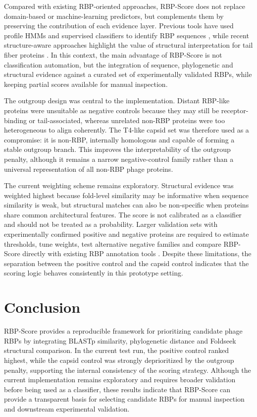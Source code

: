 \documentclass[runningheads]{llncs}
\begin{document}
Compared with existing RBP-oriented approaches, RBP-Score does not replace domain-based or machine-learning predictors, but complements them by preserving the contribution of each evidence layer. Previous tools have used profile HMMs and supervised classifiers to identify RBP sequences \cite{boeckaerts2022}, while recent structure-aware approaches highlight the value of structural interpretation for tail fiber proteins \cite{kleinSousa2025}. In this context, the main advantage of RBP-Score is not classification automation, but the integration of sequence, phylogenetic and structural evidence against a curated set of experimentally validated RBPs, while keeping partial scores available for manual inspection.

The outgroup design was central to the implementation. Distant RBP-like proteins were unsuitable as negative controls because they may still be receptor-binding or tail-associated, whereas unrelated non-RBP proteins were too heterogeneous to align coherently. The T4-like capsid set was therefore used as a compromise: it is non-RBP, internally homologous and capable of forming a stable outgroup branch. This improves the interpretability of the outgroup penalty, although it remains a narrow negative-control family rather than a universal representation of all non-RBP phage proteins.

The current weighting scheme remains exploratory. Structural evidence was weighted highest because fold-level similarity may be informative when sequence similarity is weak, but structural matches can also be non-specific when proteins share common architectural features. The score is not calibrated as a classifier and should not be treated as a probability. Larger validation sets with experimentally confirmed positive and negative proteins are required to estimate thresholds, tune weights, test alternative negative families and compare RBP-Score directly with existing RBP annotation tools \cite{boeckaerts2022,kleinSousa2025}. Despite these limitations, the separation between the positive control and the capsid control indicates that the scoring logic behaves consistently in this prototype setting.

\section{Conclusion}

RBP-Score provides a reproducible framework for prioritizing candidate phage RBPs by integrating BLASTp similarity, phylogenetic distance and Foldseek structural comparison. In the current test run, the positive control ranked highest, while the capsid control was strongly deprioritized by the outgroup penalty, supporting the internal consistency of the scoring strategy. Although the current implementation remains exploratory and requires broader validation before being used as a classifier, these results indicate that RBP-Score can provide a transparent basis for selecting candidate RBPs for manual inspection and downstream experimental validation.
\end{document}
